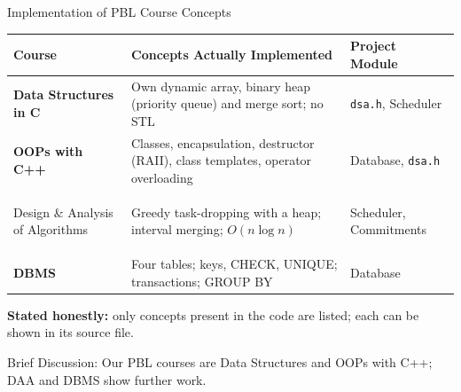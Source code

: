 \documentclass[aspectratio=169,11pt]{beamer}
\newcommand{\smallnote}[1]{%
\vspace{0.08cm}
{\scriptsize\color{GEUGrey}#1}
}
\begin{document}
\begin{frame}{Implementation of PBL Course Concepts}

\scriptsize

\begin{center}

\renewcommand{\arraystretch}{1.25}

\begin{tabularx}{.96\textwidth}
{@{}>{\bfseries}p{2.8cm}X p{2.8cm}@{}}

\toprule
Course & Concepts Actually Implemented & Project Module\\
\midrule

Data Structures in C &
Own dynamic array, binary heap (priority queue) and merge sort; no STL &
\texttt{dsa.h}, Scheduler\\

OOPs with C++ &
Classes, encapsulation, destructor (RAII), class templates, operator overloading &
Database, \texttt{dsa.h}\\

\midrule

Design \& Analysis of Algorithms &
Greedy task-dropping with a heap; interval merging; $O(n \log n)$ &
Scheduler, Commitments\\

DBMS &
Four tables; keys, CHECK, UNIQUE; transactions; GROUP BY &
Database\\

\bottomrule

\end{tabularx}

\end{center}

\vfill

\begin{center}
\colorbox{GEULightBlue}{
\parbox{.88\textwidth}{
\centering
\textbf{Stated honestly:}
only concepts present in the code are listed; each can be shown in its source file.
}}
\end{center}

\smallnote{
Brief Discussion: Our PBL courses are Data Structures and OOPs with C++; DAA and DBMS show further work.
}

\end{frame}
\end{document}
